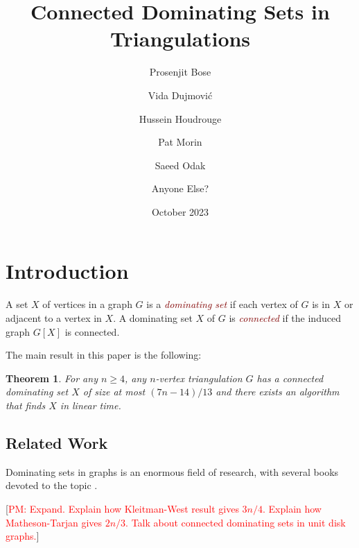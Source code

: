 \documentclass[12pt]{article}
\title{Connected Dominating Sets in Triangulations}
\author{Prosenjit Bose \and Vida Dujmović \and Hussein Houdrouge \and Pat Morin \and Saeed Odak \and Anyone Else?}
\date{October 2023}
\newtheorem{thm}{Theorem}
\newcommand{\defin}[1]{\emph{\textcolor{Maroon}{#1}}}
\newcommand{\pat}[1]{[\textcolor{red}{PM: #1}]}
\begin{document}
\maketitle



\section{Introduction}

A set $X$ of vertices in a graph $G$ is a \defin{dominating set} if each vertex of $G$ is in $X$ or adjacent to a vertex in $X$.  A dominating set $X$ of $G$ is \defin{connected} if the induced graph $G[X]$ is connected.


The main result in this paper is the following:

\begin{thm}\label{main_result2}
  For any $n\ge 4$, any $n$-vertex triangulation $G$ has a connected dominating set $X$ of size at most $(7n-14)/13$ and there exists an algorithm that finds $X$ in linear time.
\end{thm}

\subsection{Related Work}

Dominating sets in graphs is an enormous field of research, with several books  devoted to the topic \cite{haynes.hedetniemi.ea:domination,haynes.hedetniemi.ea:topics}.

\pat{Expand.  Explain how Kleitman-West result gives $3n/4$.  Explain how Matheson-Tarjan gives $2n/3$.  Talk about connected dominating sets in unit disk graphs.}
\end{document}
